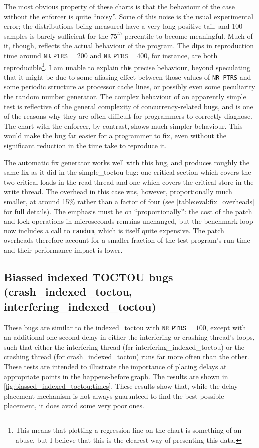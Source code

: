 The most obvious property of these charts is that the behaviour of the
case without the enforcer is quite ``noisy''.  Some of this noise is
the usual experimental error; the distributions being measured have a
very long positive tail, and 100 samples is barely sufficient for the
$75^{th}$ percentile to become meaningful.  Much of it, though,
reflects the actual behaviour of the program.  The dips in
reproduction time around $\texttt{NR\_PTRS} = 200$ and
$\texttt{NR\_PTRS} = 400$, for instance, are both
reproducible\footnote{This means that plotting a regression line on
  the chart is something of an abuse, but I believe that this is the
  clearest way of presenting this data.}.  I am unable to explain this
precise behaviour, beyond speculating that it might be due to some
aliasing effect between those values of \texttt{NR\_PTRS} and some
periodic structure as processor cache lines, or possibly even some
peculiarity the random number generator.  The complex behaviour of an
apparently simple test is reflective of the general complexity of
concurrency-related bugs, and is one of the reasons why they are often
difficult for programmers to correctly diagnose\needCite{}.  The chart
with the enforcer, by contrast, shows much simpler behaviour.  This
would make the bug far easier for a programmer to fix, even without
the significant reduction in the time take to reproduce it.

The automatic fix generator works well with this bug, and produces
roughly the same fix as it did in the simple\_toctou bug: one critical
section which covers the two critical loads in the read thread and one
which covers the critical store in the write thread.  The overhead in
this case was, however, proportionally much smaller, at around 15\%
rather than a factor of four (see \autoref{table:eval:fix_overheads}
for full details).  The emphasis must be on ``proportionally'': the
cost of the patch and lock operations in microseconds remains
unchanged, but the benchmark loop now includes a call to
\texttt{random}, which is itself quite expensive.  The patch overheads
therefore account for a smaller fraction of the test program's run
time and their performance impact is lower.

\subsection{Biassed indexed TOCTOU bugs (crash\_indexed\_toctou, interfering\_indexed\_toctou)}

These bugs are similar to the indexed\_toctou with $\texttt{NR\_PTRS}
= 100$, except with an additional one second delay in either the
interfering or crashing thread's loops, such that either the
interfering thread (for interfering\_indexed\_toctou) or the crashing
thread (for crash\_indexed\_toctou) runs far more often than the
other.  These tests are intended to illustrate the importance of
placing delays at appropriate points in the happens-before graph.  The
results are shown in \autoref{fig:biassed_indexed_toctou:times}.
These results show that, while the delay placement mechanism is not
always guaranteed to find the best possible placement, it does avoid
some very poor ones.

